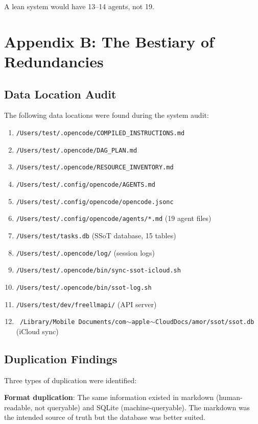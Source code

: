 \documentclass[12pt,a4paper,oneside]{book}
\begin{document}
A lean system would have 13--14 agents, not 19.

\chapter{Appendix B: The Bestiary of Redundancies}

\section{Data Location Audit}

The following data locations were found during the system audit:

\begin{enumerate}
  \item \texttt{/Users/test/.opencode/COMPILED\_INSTRUCTIONS.md}
  \item \texttt{/Users/test/.opencode/DAG\_PLAN.md}
  \item \texttt{/Users/test/.opencode/RESOURCE\_INVENTORY.md}
  \item \texttt{/Users/test/.config/opencode/AGENTS.md}
  \item \texttt{/Users/test/.config/opencode/opencode.jsonc}
  \item \texttt{/Users/test/.config/opencode/agents/*.md} (19 agent files)
  \item \texttt{/Users/test/tasks.db} (SSoT database, 15 tables)
  \item \texttt{/Users/test/.opencode/log/} (session logs)
  \item \texttt{/Users/test/.opencode/bin/sync-ssot-icloud.sh}
  \item \texttt{/Users/test/.opencode/bin/ssot-log.sh}
  \item \texttt{/Users/test/dev/freellmapi/} (API server)
  \item \texttt{~/Library/Mobile Documents/com$\sim$apple$\sim$CloudDocs/amor/ssot/ssot.db} (iCloud sync)
\end{enumerate}

\section{Duplication Findings}

Three types of duplication were identified:

\textbf{Format duplication}: The same information existed in markdown (human-readable, not queryable) and SQLite (machine-queryable). The markdown was the intended source of truth but the database was better suited.
\end{document}
